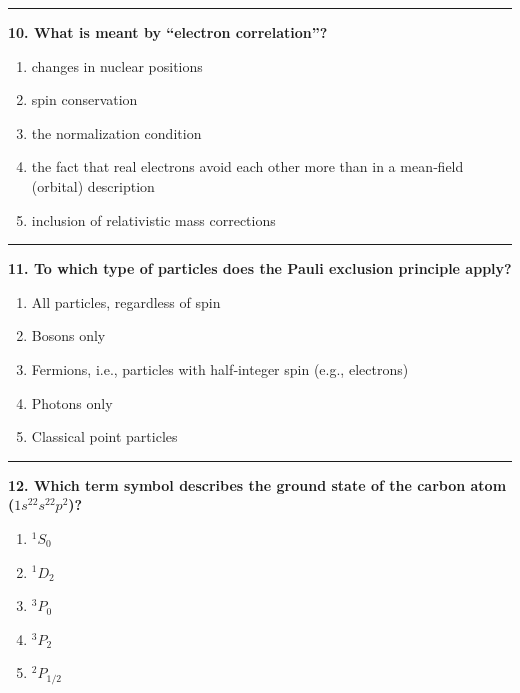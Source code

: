 \documentclass[
  english,
  9pt,
]{extbook}
\providecommand{\tightlist}{%
  \setlength{\itemsep}{0pt}\setlength{\parskip}{0pt}}
\theoremstyle{definition}
\theoremstyle{definition}
\theoremstyle{definition}
\theoremstyle{definition}
\theoremstyle{remark}
\begin{document}
\begin{center}\rule{0.5\linewidth}{0.5pt}\end{center}

\textbf{10. What is meant by ``electron correlation''?}

\begin{enumerate}
\def\labelenumi{\alph{enumi}.}
\tightlist
\item
  changes in nuclear positions
\item
  spin conservation
\item
  the normalization condition
\item
  the fact that real electrons avoid each other more than in a mean‑field (orbital) description
\item
  inclusion of relativistic mass corrections
\end{enumerate}

\begin{center}\rule{0.5\linewidth}{0.5pt}\end{center}

\textbf{11. To which type of particles does the Pauli exclusion principle apply?}

\begin{enumerate}
\def\labelenumi{\alph{enumi}.}
\tightlist
\item
  All particles, regardless of spin\\
\item
  Bosons only\\
\item
  Fermions, i.e., particles with half‑integer spin (e.g., electrons)\\
\item
  Photons only\\
\item
  Classical point particles
\end{enumerate}

\begin{center}\rule{0.5\linewidth}{0.5pt}\end{center}

\textbf{12. Which term symbol describes the ground state of the carbon atom (\(1s^22s^22p^2\))?}

\begin{enumerate}
\def\labelenumi{\alph{enumi}.}
\tightlist
\item
  \(^1S_0\)\\
\item
  \(^1D_2\)\\
\item
  \(^3P_0\)\\
\item
  \(^3P_2\)\\
\item
  \(^2P_{1/2}\)
\end{enumerate}
\end{document}
